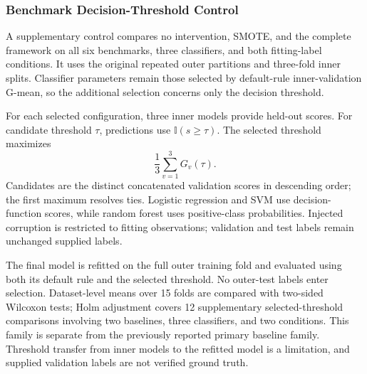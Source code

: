 \subsubsection{Benchmark Decision-Threshold Control}
A supplementary control compares no intervention, SMOTE, and the complete framework on all six benchmarks, three classifiers, and both fitting-label conditions. It uses the original repeated outer partitions and three-fold inner splits. Classifier parameters remain those selected by default-rule inner-validation G-mean, so the additional selection concerns only the decision threshold.

For each selected configuration, three inner models provide held-out scores. For candidate threshold $\tau$, predictions use $\mathbb{I}(s\geq\tau)$. The selected threshold maximizes
\begin{equation}
\frac{1}{3}\sum_{v=1}^{3}G_v(\tau).
\end{equation}
Candidates are the distinct concatenated validation scores in descending order; the first maximum resolves ties. Logistic regression and SVM use decision-function scores, while random forest uses positive-class probabilities. Injected corruption is restricted to fitting observations; validation and test labels remain unchanged supplied labels.

The final model is refitted on the full outer training fold and evaluated using both its default rule and the selected threshold. No outer-test labels enter selection. Dataset-level means over 15 folds are compared with two-sided Wilcoxon tests; Holm adjustment covers 12 supplementary selected-threshold comparisons involving two baselines, three classifiers, and two conditions. This family is separate from the previously reported primary baseline family. Threshold transfer from inner models to the refitted model is a limitation, and supplied validation labels are not verified ground truth.
